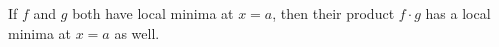 \documentclass{ximera}
\author{Steven Gubkin}
\begin{document}
\begin{exercise}


If $f$ and $g$ both have local minima at $x=a$, then their product $f\cdot g$ has a local minima at $x=a$ as well.

\begin{multipleChoice}	
\end{multipleChoice}

\end{exercise}
\end{document}
